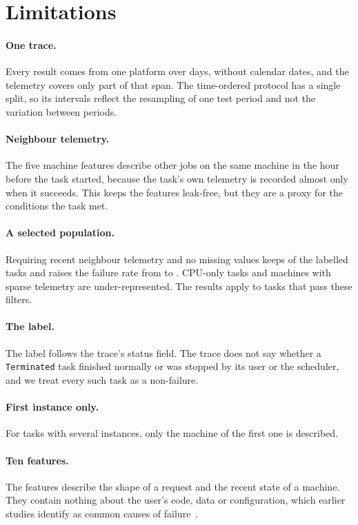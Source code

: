 \section{Limitations}
\label{sec:limitations}

\paragraph{One trace.} Every result comes from one platform over  days, without calendar dates, and the telemetry covers only part of that span. The time-ordered protocol has a single split, so its intervals reflect the resampling of one test period and not the variation between periods.

\paragraph{Neighbour telemetry.} The five machine features describe other jobs on the same machine in the hour before the task started, because the task's own telemetry is recorded almost only when it succeeds. This keeps the features leak-free, but they are a proxy for the conditions the task met.

\paragraph{A selected population.} Requiring recent neighbour telemetry and no missing values keeps  of the labelled tasks and raises the failure rate from  to . CPU-only tasks and machines with sparse telemetry are under-represented. The results apply to tasks that pass these filters.

\paragraph{The label.} The label follows the trace's status field. The trace does not say whether a \texttt{Terminated} task finished normally or was stopped by its user or the scheduler, and we treat every such task as a non-failure.

\paragraph{First instance only.} For tasks with several instances, only the machine of the first one is described.

\paragraph{Ten features.} The features describe the shape of a request and the recent state of a machine. They contain nothing about the user's code, data or configuration, which earlier studies identify as common causes of failure~\cite{jeon2019philly,zhang2020dlfailures}.

